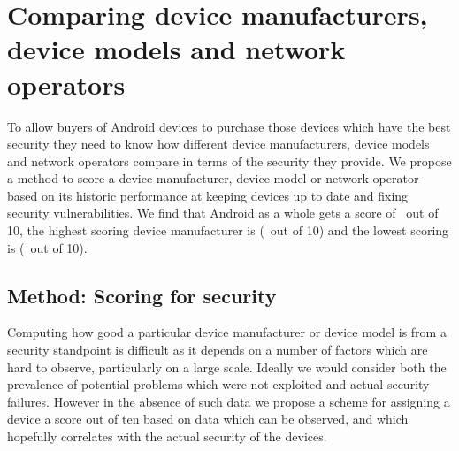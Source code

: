 \section{Comparing device manufacturers, device models and network operators}
\label{sec:security_scoring}\label{sec:exp:security_score}

To allow buyers of Android devices to purchase those devices which have the best security they need to know how different device manufacturers, device models and network operators compare in terms of the security they provide.
We propose a method to score a device manufacturer, device model or network operator based on its historic performance at keeping devices up to date and fixing security vulnerabilities.
We find that Android as a whole gets a score of \daSecurityScore\ out of 10, the highest scoring device manufacturer is \emph{\daSecScoreBestmanufacturer} (\daSecScoreBestmanufacturerScore\ out of 10) and the lowest scoring is \emph{\daSecScoreWorstmanufacturer} (\daSecScoreWorstmanufacturerScore\ out of 10).

\subsection{Method: Scoring for security}\label{sec:security_scoring:method}

Computing how good a particular device manufacturer or device model is from a security standpoint is difficult as it depends on a number of factors which are hard to observe, particularly on a large scale.
Ideally we would consider both the prevalence of potential problems which were not exploited and actual security failures.
However in the absence of such data we propose a scheme for assigning a device a score out of ten based on data which can be observed, and which hopefully correlates with the actual security of the devices.

